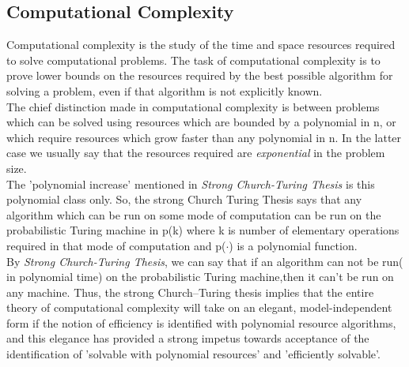 \subsection{Computational Complexity}
Computational complexity is the study of the time and space resources required to solve computational problems. The task of computational complexity is to prove lower bounds on the resources required by the best possible algorithm for solving a problem, even if that algorithm is not explicitly known.\\
The chief distinction made in computational complexity is between problems which can be solved using resources which are bounded by a polynomial in n, or which require resources which grow faster than any polynomial in n. In the latter case we usually say that the resources required are {\it exponential} in the problem size.\\
The 'polynomial increase' mentioned in {\it Strong Church-Turing Thesis} is this polynomial class only. So, the strong Church Turing Thesis says that any algorithm which can be run on some mode of computation can be run on the probabilistic Turing machine in p(k) where k is number of elementary operations required in that mode of computation and p({$\cdotp$}) is a polynomial function.\\
By {\it Strong Church-Turing Thesis}, we can say that if an algorithm can not be run( in polynomial time) on the probabilistic Turing machine,then it can't be run on any machine. Thus, the strong Church–Turing thesis implies that the entire theory of computational complexity will take on an elegant, model-independent form if the notion of efficiency is identified with polynomial resource algorithms, and this elegance has provided a strong impetus towards acceptance of the identification of 'solvable with polynomial resources'  and  'efficiently solvable'.

